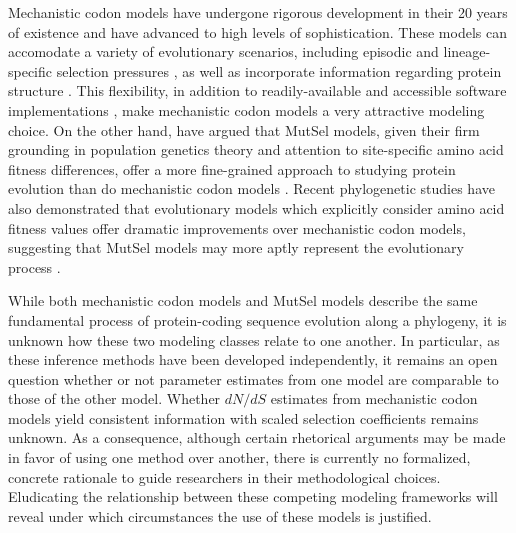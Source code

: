 \documentclass{pnastwo}
\begin{document}
\begin{article}
Mechanistic codon models have undergone rigorous development in their 20 years of existence and have advanced to high levels of sophistication. These models can accomodate a variety of evolutionary scenarios, including episodic \cite{KosakovskyPondetal2011,MEME} and lineage-specific selection pressures \cite{YangNielsen2002,Zhangetal2005,KosakovskyPondFrost2005}, as well as incorporate information regarding protein structure \cite{Robinsonetal2003,Scherreretal2012,MeyerWilke2012}. This flexibility, in addition to readily-available and accessible software implementations \cite{KosakovskyPondetal2005,Yang2007,Delport2010}, make mechanistic codon models a very attractive modeling choice. On the other hand, have argued that MutSel models, given their firm grounding in population genetics theory and attention to site-specific amino acid fitness differences, offer a more fine-grained approach to studying protein evolution than do mechanistic codon models \cite{HalpernBruno1998,Rodrigueetal2010,Tamuri2012,Thorne2012}. Recent phylogenetic studies have also demonstrated that evolutionary models which explicitly consider amino acid fitness values offer dramatic improvements over mechanistic codon models, suggesting that MutSel models may more aptly represent the evolutionary process \cite{Bloom2014a, Bloom2014b}. 
	

While both mechanistic codon models and MutSel models describe the same fundamental process of protein-coding sequence evolution along a phylogeny, it is unknown how these two modeling classes relate to one another. In particular, as these inference methods have been developed independently, it remains an open question whether or not parameter estimates from one model are comparable to those of the other model. Whether $dN/dS$ estimates from mechanistic codon models yield consistent information with scaled selection coefficients remains unknown. As a consequence, although certain rhetorical arguments may be made in favor of using one method over another, there is currently no formalized, concrete rationale to guide researchers in their methodological choices. Eludicating the relationship between these competing modeling frameworks will reveal under which circumstances the use of these models is justified.



\end{article}
\end{document}
